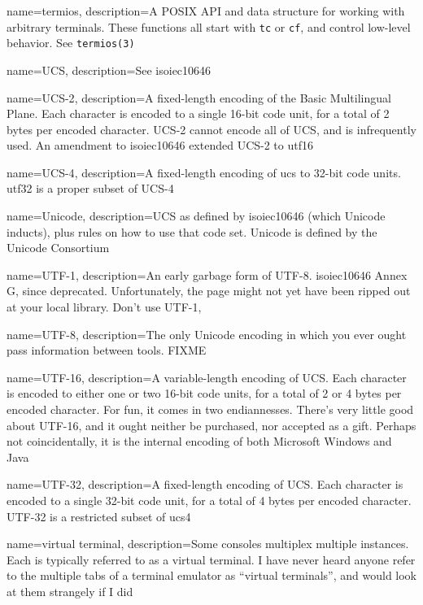 {
  name={termios},
description={A POSIX API and data structure for working with arbitrary terminals.
  These functions all start with \texttt{tc} or \texttt{cf}, and control
  low-level behavior. See \texttt{termios(3)}\cite{termios}}
}

{
  name={UCS},
  description={See \Gls{isoiec10646}}
}

{
  name={UCS-2},
description={A fixed-length encoding of the Basic Multilingual Plane. Each
  character is encoded to a single 16-bit code unit, for a total of 2 bytes
  per encoded character. UCS-2 cannot encode all of UCS, and is infrequently
  used. An amendment to \Gls{isoiec10646} extended UCS-2 to \Gls{utf16}}
}

{
  name={UCS-4},
description={A fixed-length encoding of \Gls{ucs} to 32-bit code units.
  \Gls{utf32} is a proper subset of UCS-4\cite{rfc3629}}
}

{
  name={Unicode},
description={UCS as defined by \Gls{isoiec10646} (which Unicode inducts), plus
  rules on how to use that code set. Unicode is defined by the Unicode
  Consortium}
}

{
  name={UTF-1},
description={An early garbage form of UTF-8. \Gls{isoiec10646} Annex G, since deprecated.
  Unfortunately, the page might not yet have been ripped out at your local
  library. Don't use UTF-1},
}

{
  name={UTF-8},
description={The only Unicode encoding in which you ever ought pass information
  between tools\cite{utf8everywhere}. FIXME}
}

{
  name={UTF-16},
description={A variable-length encoding of UCS. Each character is encoded to
  either one or two 16-bit code units, for a total of 2 or 4 bytes per
  encoded character. For fun, it comes in two endiannesses. There's very little
  good about UTF-16, and it ought neither be purchased, nor accepted as a gift.
  Perhaps not coincidentally, it is the internal encoding of both Microsoft
  Windows and Java}
}

{
  name={UTF-32},
description={A fixed-length encoding of UCS. Each character is encoded to a
  single 32-bit code unit, for a total of 4 bytes per encoded character. UTF-32
  is a restricted subset of \Gls{ucs4}\cite{rfc3629}}
}

{
  name={virtual terminal},
description={Some consoles multiplex multiple instances. Each is
  typically referred to as a virtual terminal. I have never heard anyone
  refer to the multiple tabs of a terminal emulator as ``virtual terminals'',
  and would look at them strangely if I did}
}

